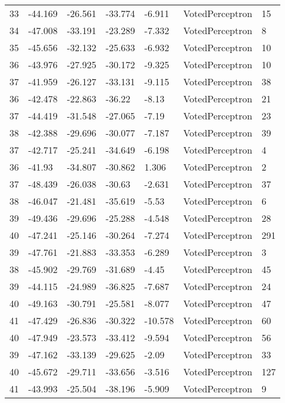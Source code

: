 \begin{tabular}{lllllll}
33 & -44.169 & -26.561 & -33.774 &  -6.911 &    VotedPerceptron &   15 \\
34 & -47.008 & -33.191 & -23.289 &  -7.332 &    VotedPerceptron &    8 \\
35 & -45.656 & -32.132 & -25.633 &  -6.932 &    VotedPerceptron &   10 \\
36 & -43.976 & -27.925 & -30.172 &  -9.325 &    VotedPerceptron &   10 \\
37 & -41.959 & -26.127 & -33.131 &  -9.115 &    VotedPerceptron &   38 \\
36 & -42.478 & -22.863 &  -36.22 &   -8.13 &    VotedPerceptron &   21 \\
37 & -44.419 & -31.548 & -27.065 &   -7.19 &    VotedPerceptron &   23 \\
38 & -42.388 & -29.696 & -30.077 &  -7.187 &    VotedPerceptron &   39 \\
37 & -42.717 & -25.241 & -34.649 &  -6.198 &    VotedPerceptron &    4 \\
36 &  -41.93 & -34.807 & -30.862 &   1.306 &    VotedPerceptron &    2 \\
37 & -48.439 & -26.038 &  -30.63 &  -2.631 &    VotedPerceptron &   37 \\
38 & -46.047 & -21.481 & -35.619 &   -5.53 &    VotedPerceptron &    6 \\
39 & -49.436 & -29.696 & -25.288 &  -4.548 &    VotedPerceptron &   28 \\
40 & -47.241 & -25.146 & -30.264 &  -7.274 &    VotedPerceptron &  291 \\
39 & -47.761 & -21.883 & -33.353 &  -6.289 &    VotedPerceptron &    3 \\
38 & -45.902 & -29.769 & -31.689 &   -4.45 &    VotedPerceptron &   45 \\
39 & -44.115 & -24.989 & -36.825 &  -7.687 &    VotedPerceptron &   24 \\
40 & -49.163 & -30.791 & -25.581 &  -8.077 &    VotedPerceptron &   47 \\
41 & -47.429 & -26.836 & -30.322 & -10.578 &    VotedPerceptron &   60 \\
40 & -47.949 & -23.573 & -33.412 &  -9.594 &    VotedPerceptron &   56 \\
39 & -47.162 & -33.139 & -29.625 &   -2.09 &    VotedPerceptron &   33 \\
40 & -45.672 & -29.711 & -33.656 &  -3.516 &    VotedPerceptron &  127 \\
41 & -43.993 & -25.504 & -38.196 &  -5.909 &    VotedPerceptron &    9 \\

\end{tabular}
